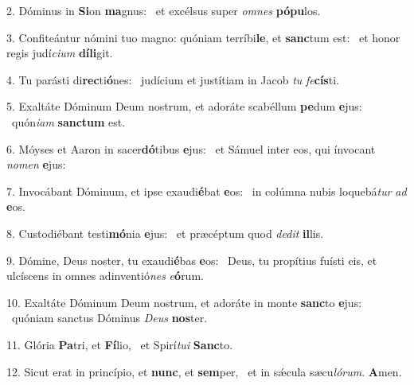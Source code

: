 2. Dóminus in \textbf{Si}on \textbf{ma}gnus: \ast\  et excélsus super \textit{om}\textit{nes} \textbf{pó}\textbf{pu}los.\

3. Confiteántur nómini tuo magno: quóniam terríbi\textbf{le}, et \textbf{sanc}tum est: \ast\  et honor regis judí\textit{ci}\textit{um} \textbf{dí}\textbf{li}git.\

4. Tu parásti di\textbf{rec}ti\textbf{ó}nes: \ast\  judícium et justítiam in Jacob \textit{tu} \textit{fe}\textbf{cís}ti.\

5. Exaltáte Dóminum Deum nostrum, et adoráte scabéllum \textbf{pe}dum \textbf{e}jus: \ast\  quón\textit{i}\textit{am} \textbf{sanc}\textbf{tum} est.\

6. Móyses et Aaron in sacer\textbf{dó}tibus \textbf{e}jus: \ast\  et Sámuel inter eos, qui ínvocant \textit{no}\textit{men} \textbf{e}jus:\

7. Invocábant Dóminum, et ipse exaudi\textbf{é}bat \textbf{e}os: \ast\  in colúmna nubis loquebá\textit{tur} \textit{ad} \textbf{e}os.\

8. Custodiébant testi\textbf{mó}nia \textbf{e}jus: \ast\  et præcéptum quod \textit{de}\textit{dit} \textbf{il}lis.\

9. Dómine, Deus noster, tu exaudi\textbf{é}bas \textbf{e}os: \ast\  Deus, tu propítius fuísti eis, et ulcíscens in omnes adinventió\textit{nes} \textit{e}\textbf{ó}rum.\

10. Exaltáte Dóminum Deum nostrum, et adoráte in monte \textbf{sanc}to \textbf{e}jus: \ast\  quóniam sanctus Dóminus \textit{De}\textit{us} \textbf{nos}ter.\

11. Glória \textbf{Pa}tri, et \textbf{Fí}lio, \ast\  et Spirí\textit{tu}\textit{i} \textbf{Sanc}to.\

12. Sicut erat in princípio, et \textbf{nunc}, et \textbf{sem}per, \ast\  et in sǽcula sæcu\textit{ló}\textit{rum}. \textbf{A}men.\

